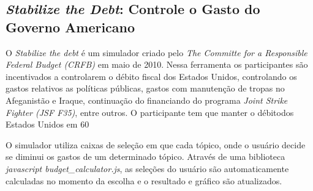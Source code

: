 \subsection{\textit{Stabilize the Debt}: Controle o Gasto do Governo Americano}

O \textit{Stabilize the debt} é um simulador criado pelo \textit{The Committe for a Responsible  Federal Budget  (CRFB)}  em  maio  de  2010.  Nessa  ferramenta  os  participantes  são  incentivados  a controlarem  o  débito  fiscal  dos  Estados  Unidos,  controlando  os  gastos  relativos  as  políticas públicas, gastos com manutenção de tropas no Afeganistão e Iraque, continuação do financiando do programa \textit{Joint Strike Fighter (JSF F35)}, entre outros. O participante tem que manter o débitodos Estados Unidos em 60%

O simulador utiliza caixas de seleção em que cada tópico, onde o usuário decide se diminui os gastos  de  um  determinado  tópico.  Através  de  uma  biblioteca  \textit{javascript  budget\_calculator.js},  as seleções do usuário são automaticamente calculadas no momento da escolha e o resultado e gráfico são atualizados.



